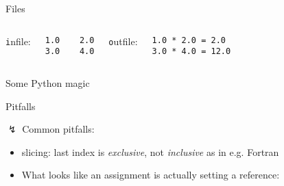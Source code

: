 \begin{frame}[fragile]{Files}



\begin{columns}
{\texttt infile}:
\begin{verbatim}
1.0    2.0
3.0    4.0
\end{verbatim}


{\texttt outfile}:
\begin{verbatim}
1.0 * 2.0 = 2.0
3.0 * 4.0 = 12.0
\end{verbatim}  

\end{columns}

\end{frame}

\begin{frame}{Some Python magic}



\end{frame}

\begin{frame}{Pitfalls}

$\lightning$ Common pitfalls:

\begin{itemize}
    \item slicing: last index is \emph{exclusive}, not \emph{inclusive} as in e.g. Fortran
    
    \item What looks like an assignment is actually setting a reference:
    
\end{itemize}

\end{frame}

